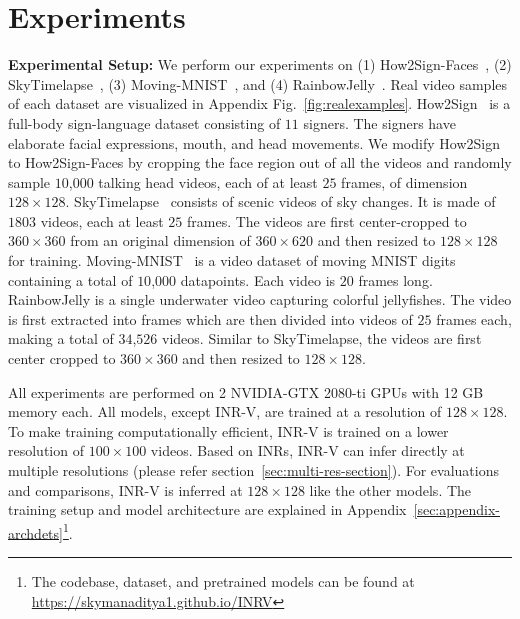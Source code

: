 \documentclass[10pt]{article} \usepackage[accepted]{tmlr}
\begin{document}
\section{Experiments}

\textbf{Experimental Setup: }
\label{exp_setup}
We perform our experiments on (1) How2Sign-Faces~\cite{how2sign}, (2) SkyTimelapse~\cite{skytimelapse}, (3) Moving-MNIST~\cite{moving-mnist}, and (4) RainbowJelly~\cite{stylegan-v}. Real video samples of each dataset are visualized in Appendix Fig.~\ref{fig:realexamples}. How2Sign~\cite{how2sign} is a full-body sign-language dataset consisting of $11$ signers. The signers have elaborate facial expressions, mouth, and head movements. We modify How2Sign to How2Sign-Faces by cropping the face region out of all the videos and randomly sample $10$,$000$ talking head videos, each of at least $25$ frames, of dimension $128 \times 128$. SkyTimelapse~\cite{skytimelapse} consists of scenic videos of sky changes. It is made of $1803$ videos, each at least $25$ frames. The videos are first center-cropped to $360 \times 360$ from an original dimension of $360 \times 620$ and then resized to $128 \times 128$ for training. Moving-MNIST~\cite{moving-mnist} is a video dataset of moving MNIST digits containing a total of $10$,$000$ datapoints. Each video is $20$ frames long.  
RainbowJelly is a single underwater video capturing colorful jellyfishes. The video is first extracted into frames which are then divided into videos of $25$ frames each, making a total of $34$,$526$ videos.
Similar to SkyTimelapse, the videos are first center cropped to $360 \times 360$ and then resized to $128 \times 128$.

All experiments are performed on 2 NVIDIA-GTX 2080-ti GPUs with 12 GB memory each. All models, except INR-V, are trained at a resolution of $128 \times 128$. To make training computationally efficient, INR-V is trained on a lower resolution of $100 \times 100$ videos. Based on INRs, INR-V can infer directly at multiple resolutions (please refer section~\ref{sec:multi-res-section}). For evaluations and comparisons, INR-V is inferred at $128 \times 128$ like the other models.  
The training setup and model architecture are explained in Appendix~\ref{sec:appendix-archdets}\def\thefootnote{$^1$}\footnote{The codebase, dataset, and pretrained models can be found at \textcolor{blue}{\href{https://skymanaditya1.github.io/INRV}{https://skymanaditya1.github.io/INRV}}}.
\end{document}
